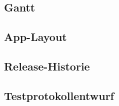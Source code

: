 \newpage
\subsection{Gantt}
\begin{landscape}
	
\end{landscape}

\subsection{App-Layout}
\label{subsec:App-Layout}
	
	
\subsection{Release-Historie}
\label{subsec:Release-Historie}
		
	
\subsection{Testprotokollentwurf}
\label{subsec:Testprotokollentwurf}
	
	

	





